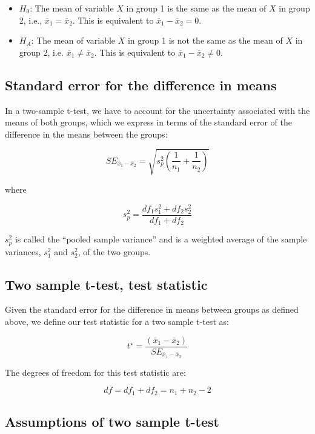 \documentclass[]{book}
\theoremstyle{definition}
\theoremstyle{definition}
\theoremstyle{definition}
\theoremstyle{remark}
\begin{document}
\begin{itemize}
\item
  \(H_0\): The mean of variable \(X\) in group 1 is the same as the mean
  of \(X\) in group 2, i.e., \(\overline{x}_1 = \overline{x}_2\). This
  is equivalent to \(\overline{x}_1 - \overline{x}_2 = 0\).
\item
  \(H_A\): The mean of variable \(X\) in group 1 is not the same as the
  mean of \(X\) in group 2, i.e. \(\overline{x}_1 \neq \overline{x}_2\).
  This is equivalent to \(\overline{x}_1 - \overline{x}_2 \neq 0\).
\end{itemize}

\hypertarget{standard-error-for-the-difference-in-means}{%
\subsection{Standard error for the difference in
means}\label{standard-error-for-the-difference-in-means}}

In a two-sample t-test, we have to account for the uncertainty
associated with the means of both groups, which we express in terms of
the standard error of the difference in the means between the groups:

\[
SE_{\overline{x}_1 - \overline{x}_2}  =  \sqrt{s^2_p\left(\frac{1}{n_1} + \frac{1}{n_2} \right)}
\]

where

\[
s^2_p = \frac{df_1 s_1^2 + df_2 s_2^2}{df_1 + df_2}
\]

\(s^2_p\) is called the ``pooled sample variance'' and is a weighted
average of the sample variances, \(s_1^2\) and \(s_2^2\), of the two
groups.

\hypertarget{two-sample-t-test-test-statistic}{%
\subsection{Two sample t-test, test
statistic}\label{two-sample-t-test-test-statistic}}

Given the standard error for the difference in means between groups as
defined above, we define our test statistic for a two sample t-test as:

\[
t^\star = \frac{(\overline{x}_1 - \overline{x}_2)}{SE_{\overline{x}_1 - \overline{x}_2}}
\]

The degrees of freedom for this test statistic are:

\[
df = df_1 + df_2 = n_1 + n_2 - 2
\]

\hypertarget{assumptions-of-two-sample-t-test}{%
\subsection{Assumptions of two sample
t-test}\label{assumptions-of-two-sample-t-test}}
\end{document}
